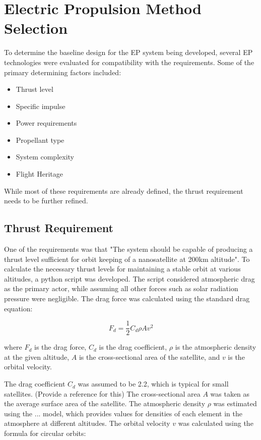 \chapter{Electric Propulsion Method Selection}

To determine the baseline design for the \ac{EP} system being developed, several EP technologies were evaluated for compatibility with the requirements. Some of the primary determining factors included:

\begin{itemize}
    \item Thrust level
    \item Specific impulse
    \item Power requirements
    \item Propellant type
    \item System complexity
    \item Flight Heritage
\end{itemize}

While most of these requirements are already defined, the thrust requirement needs to be further refined. 
\section{Thrust Requirement}
One of the requirements was that "The system should be capable of producing a thrust level sufficient for orbit keeping of a nanosatellite at 200km altitude". To calculate the necessary thrust levels for maintaining a stable orbit at various altitudes, a python script was developed. The script considered atmospheric drag as the primary actor, while assuming all other forces such as solar radiation pressure were negligible. The drag force was calculated using the standard drag equation:

\begin{equation}
    F_d = \frac{1}{2} C_d \rho A v^2
\end{equation}

where \( F_d \) is the drag force, \( C_d \) is the drag coefficient, \( \rho \) is the atmospheric density at the given altitude, \( A \) is the cross-sectional area of the satellite, and \( v \) is the orbital velocity.

The drag coefficient \( C_d \) was assumed to be 2.2, which is typical for small satellites. (Provide a reference for this) 
The cross-sectional area \( A \) was taken as the average surface area of the satellite.
The atmospheric density \( \rho \) was estimated using the ... model, which provides values for densities of each element in the atmosphere at different altitudes.
The orbital velocity \( v \) was calculated using the formula for circular orbits:

